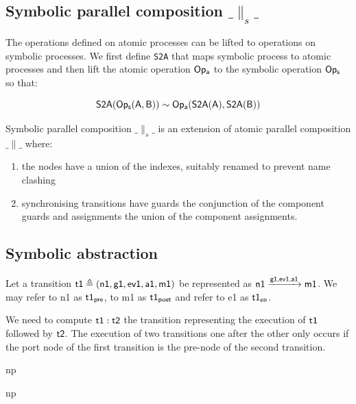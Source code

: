 \documentclass[]{article}
\begin{document}
\subsection{Symbolic parallel composition $\_\parallel_s\_$}
The operations defined on atomic processes can be lifted to operations on symbolic processes. We first define \verb|S2A| that maps symbolic process to atomic processes and then lift  the atomic  operation ${\sf Op_a}$ to the symbolic operation ${\sf Op_s}$ so that:

\[{\sf S2A(Op_s(A,B))\sim  Op_a(S2A(A),S2A(B)) }\]  

Symbolic parallel composition $\_\parallel_s\_$ is an extension of  atomic parallel composition $\_\parallel\_$ where:
\begin{enumerate}
\item the nodes have a union of the indexes, suitably renamed to prevent name clashing
\item synchronising transitions have guards the conjunction of the component guards and assignments the union of the component assignments.
\end{enumerate}


\subsection{Symbolic abstraction}


Let a transition  ${\sf t1 \triangleq (n1,g1,ev1,a1,m1)}$  be represented as   ${\sf n1\xrightarrow{\text{\sf g1,ev1,a1}} m1}$. We may refer to {\sf n1}  as ${\sf t1_{pre}}$,  to {\sf m1}  as ${\sf t1_{post}}$ and refer to {\sf e1}  as ${\sf t1_{en}}$.

We need to  compute $\sf t1: t2$  the transition representing the execution of $\sf t1$ followed by $\sf t2$.  The execution of two transitions one after the other only occurs if the port node of the first transition is the pre-node of the second transition.


 

\begin{center}\begin{minipage}{0.75\textwidth}
{{\sf np }}
\end{minipage}
\qquad 
\begin{minipage}{0.75\textwidth}
{{\sf np }}
\end{minipage}\end{center}
\end{document}
